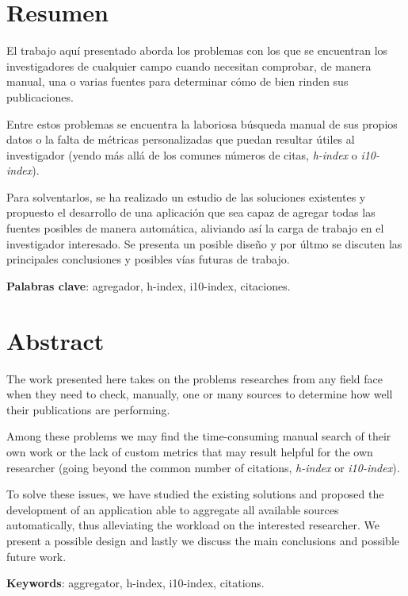 \chapter*{Resumen}
\thispagestyle{empty}

El trabajo aquí presentado aborda los problemas con los que se encuentran los investigadores de cualquier campo cuando necesitan comprobar, de manera manual, una o varias fuentes para determinar cómo de bien rinden sus publicaciones.

Entre estos problemas se encuentra la laboriosa búsqueda manual de sus propios datos o la falta de métricas personalizadas que puedan resultar útiles al investigador (yendo más allá de los comunes números de citas, \emph{h-index} o \emph{i10-index}).

Para solventarlos, se ha realizado un estudio de las soluciones existentes y propuesto el desarrollo de una aplicación que sea capaz de agregar todas las fuentes posibles de manera automática, aliviando así la carga de trabajo en el investigador interesado.
Se presenta un posible diseño y por últmo se discuten las principales conclusiones y posibles vías futuras de trabajo.

\textbf{Palabras clave}: agregador, h-index, i10-index, citaciones.

\thispagestyle{empty}

\chapter*{Abstract}

The work presented here takes on the problems researches from any field face when they need to check, manually, one or many sources to determine how well their publications are performing.

Among these problems we may find the time-consuming manual search of their own work or the lack of custom metrics that may result helpful for the own researcher (going beyond the common number of citations, \emph{h-index} or \emph{i10-index}).

To solve these issues, we have studied the existing solutions and proposed the development of an application able to aggregate all available sources automatically, thus alleviating the workload on the interested researcher.
We present a possible design and lastly we discuss the main conclusions and possible future work.

\textbf{Keywords}: aggregator, h-index, i10-index, citations.

\thispagestyle{empty}
